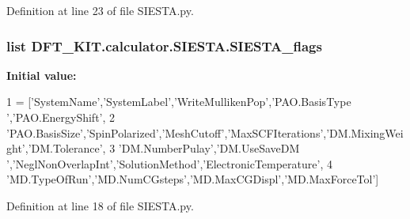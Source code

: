 Definition at line 23 of file S\+I\+E\+S\+T\+A.\+py.

\hypertarget{namespace_d_f_t___k_i_t_1_1calculator_1_1_s_i_e_s_t_a_ae83e5ef1b4c41f4272ed134b22f6f3c9}{
\subsubsection[{S\+I\+E\+S\+T\+A\+\_\+flags}]{\setlength{\rightskip}{0pt plus 5cm}list D\+F\+T\+\_\+\+K\+I\+T.\+calculator.\+S\+I\+E\+S\+T\+A.\+S\+I\+E\+S\+T\+A\+\_\+flags}}\label{namespace_d_f_t___k_i_t_1_1calculator_1_1_s_i_e_s_t_a_ae83e5ef1b4c41f4272ed134b22f6f3c9}
{\bfseries Initial value\+:}
\begin{DoxyCode}
1 = [\textcolor{stringliteral}{'SystemName'},\textcolor{stringliteral}{'SystemLabel'},\textcolor{stringliteral}{'WriteMullikenPop'},\textcolor{stringliteral}{'PAO.BasisType '},\textcolor{stringliteral}{'PAO.EnergyShift'},
2 \textcolor{stringliteral}{'PAO.BasisSize'},\textcolor{stringliteral}{'SpinPolarized'},\textcolor{stringliteral}{'MeshCutoff'},\textcolor{stringliteral}{'MaxSCFIterations'},\textcolor{stringliteral}{'DM.MixingWeight'},\textcolor{stringliteral}{'DM.Tolerance'},
3 \textcolor{stringliteral}{'DM.NumberPulay'},\textcolor{stringliteral}{'DM.UseSaveDM '},\textcolor{stringliteral}{'NeglNonOverlapInt'},\textcolor{stringliteral}{'SolutionMethod'},\textcolor{stringliteral}{'ElectronicTemperature'},
4 \textcolor{stringliteral}{'MD.TypeOfRun'},\textcolor{stringliteral}{'MD.NumCGsteps'},\textcolor{stringliteral}{'MD.MaxCGDispl'},\textcolor{stringliteral}{'MD.MaxForceTol'}]
\end{DoxyCode}


Definition at line 18 of file S\+I\+E\+S\+T\+A.\+py.

